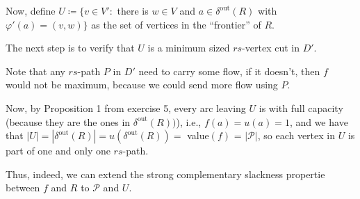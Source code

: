 \documentclass[a4paper,10pt, leqno]{article}
\theoremstyle{definition}
\begin{document}
Now, define $U \coloneqq \{v \in V' : $ there is $w \in V$ and $a \in \delta^{\text{out}}(R) $ with $\varphi'(a) = (v, w)\}$ as the set of vertices in the ``frontier'' of $R$.

The next step is to verify that $U$ is a minimum sized $rs$-vertex cut in $D'$.

Note that any $rs$-path $P$ in $D'$ need to carry some flow, if it doesn't, then $f$ would not be maximum, because we could send more flow using $P$.

Now, by Proposition 1 from exercise 5, every arc leaving $U$ is with full capacity (because they are the ones in $\delta^{\text{out}}(R))$), i.e., $f(a) = u(a) = 1$, and we have that   
$|U| = |\delta^{\text{out}}(R)| = u(\delta^{\text{out}}(R)) = $ value$(f)$ = $|\mathcal{P}|$, so each vertex in $U$ is part of one and only one $rs$-path.

Thus, indeed, we can extend the strong complementary slackness propertie between $f$ and $R$ to $\mathcal{P}$ and $U$.
\end{document}
